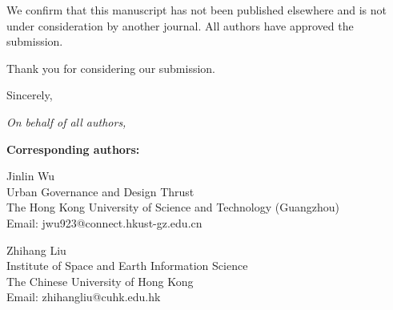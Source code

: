 \documentclass[11pt]{article}
\begin{document}
We confirm that this manuscript has not been published elsewhere and is not under consideration by another journal. All authors have approved the submission.

Thank you for considering our submission.

Sincerely,

\textit{On behalf of all authors,}

\vspace{0.5em}

\textbf{Corresponding authors:}

Jinlin Wu\\
Urban Governance and Design Thrust\\
The Hong Kong University of Science and Technology (Guangzhou)\\
Email: jwu923@connect.hkust-gz.edu.cn

Zhihang Liu\\
Institute of Space and Earth Information Science\\
The Chinese University of Hong Kong\\
Email: zhihangliu@cuhk.edu.hk
\end{document}
